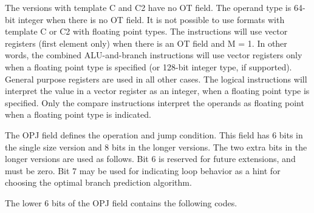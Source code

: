 \documentclass[forwardcom.tex]{subfiles}
\begin{document}
The versions with template C and C2 have no OT field. The operand type is 64-bit integer when there is no OT field. It is not possible to use formats with template C or C2 with floating point types. The instructions will use vector registers (first element only) when there is an OT field and M = 1. In other words, the combined ALU-and-branch instructions will use vector registers only when a floating point type is specified (or 128-bit integer type, if supported). General purpose registers are used in all other cases. The logical instructions will interpret the value in a vector register as an integer, when a floating point type is specified. Only the compare instructions interpret the operands as floating point when a floating point type is indicated.
\vspace{2mm}

The OPJ field defines the operation and jump condition. This field has 6 bits in the single size version and 8 bits in the longer versions. The two extra bits in the longer versions are used as follows. Bit 6 is reserved for future extensions, and must be zero. Bit 7 may be used for indicating loop behavior as a hint for choosing the optimal branch prediction algorithm.
\vspace{2mm}

The lower 6 bits of the OPJ field contains the following codes.
\end{document}
